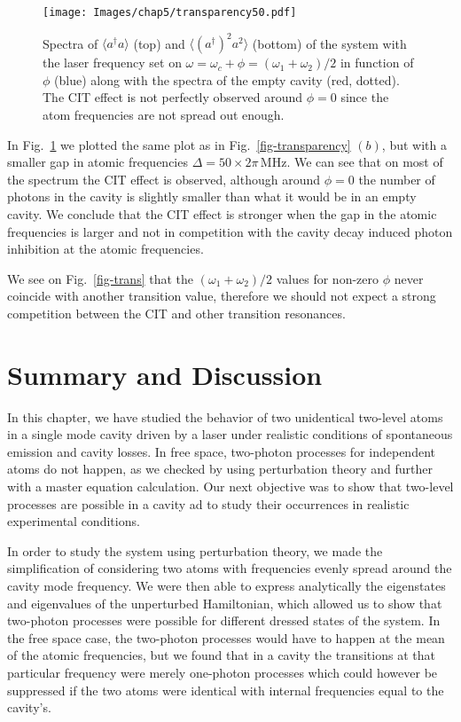 \begin{figure}
    \center
    \texttt{[image: Images/chap5/transparency50.pdf]}
    \caption[$\langle a^\dagger a \rangle$  and $\langle (a^\dagger)^2 a^2 \rangle$ ]{Spectra of $\langle a^\dagger a \rangle$ (top) and $\langle (a^\dagger)^2 a^2 \rangle$ (bottom) of the system with the laser frequency set on $\omega = \omega_c + \phi = (\omega_1+\omega_2)/2$ in function of $\phi$ (blue) along with the spectra of the empty cavity (red, dotted). The CIT effect is not perfectly observed around $\phi=0$ since the atom frequencies are not spread out enough.}
    \label{fig-transparency50}
\end{figure}

In Fig.~\ref{fig-transparency50} we plotted the same plot as in Fig.~\ref{fig-transparency} $(b)$, but with a smaller gap in atomic frequencies $\Delta =50 \times 2\pi\,\mbox{MHz}$. We can see that on most of the spectrum the CIT effect is observed, although around $\phi=0$ the number of photons in the cavity is slightly smaller than what it would be in an empty cavity. We conclude that the CIT effect is stronger when the gap in the atomic frequencies is larger and not in competition with the cavity decay induced photon inhibition at the atomic frequencies.

We see on Fig.~\ref{fig-trans} that the $(\omega_1+\omega_2)/2$ values for non-zero $\phi$ never coincide with another transition value, therefore we should not expect a strong competition between the CIT and other transition resonances.

\section{Summary and Discussion} \label{sec-QEDconcl}

In this chapter, we have studied the behavior of two unidentical two-level atoms in a single mode cavity driven by a laser under realistic conditions of spontaneous emission and cavity losses. In free space, two-photon processes for independent atoms do not happen, as we checked by using perturbation theory and further with a master equation calculation. Our next objective was to show that two-level processes are possible in a cavity ad to study their occurrences in realistic experimental conditions.

In order to study the system using perturbation theory, we made the simplification of considering two atoms with frequencies evenly spread around the cavity mode frequency. We were then able to express analytically the eigenstates and eigenvalues of the unperturbed Hamiltonian, which allowed us to show that two-photon processes were possible for different dressed states of the system. In the free space case, the two-photon processes would have to happen at the mean of the atomic frequencies, but we found that in a cavity the transitions at that particular frequency were merely one-photon processes which could however be suppressed if the two atoms were identical with internal frequencies equal to the cavity's.

